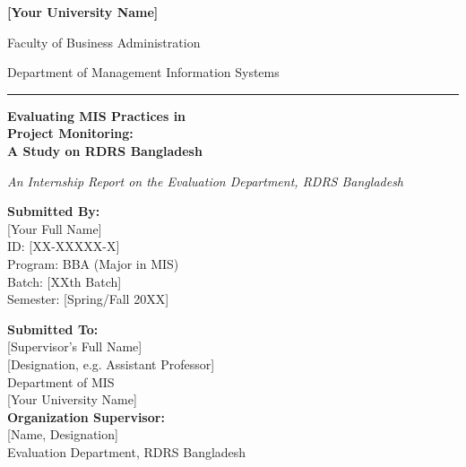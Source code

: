 \documentclass[12pt,a4paper]{report}
\begin{document}
\begin{titlepage}
    \centering

    {\Large\bfseries [Your University Name] \par}
    \vspace{4pt}
    {\large Faculty of Business Administration \par}
    {\normalsize Department of Management Information Systems \par}

    \vspace{12pt}
    \rule{\textwidth}{1.5pt}
    \vspace{12pt}

    {\LARGE\bfseries Evaluating MIS Practices in\\[6pt] Project Monitoring:\\[6pt]
        A Study on RDRS Bangladesh \par}
    \vspace{12pt}
    {\large\itshape An Internship Report on the Evaluation Department,
        RDRS Bangladesh \par}

    \vspace{16pt}

    \begin{minipage}[t]{0.46\textwidth}
        \raggedright
        \textbf{Submitted By:}\\[4pt]
        [Your Full Name]\\           %
        ID: [XX-XXXXX-X]\\           %
        Program: BBA (Major in MIS)\\%
        Batch: [XXth Batch]\\        %
        Semester: [Spring/Fall 20XX] %
    \end{minipage}
    \hfill
    \begin{minipage}[t]{0.46\textwidth}
        \raggedright
        \textbf{Submitted To:}\\[4pt]
        [Supervisor's Full Name]\\[4pt] %
        [Designation, e.g. Assistant Professor]\\[4pt] %
        Department of MIS\\[4pt]        %
        [Your University Name]\\
        \vspace{6pt}
        \textbf{Organization Supervisor:}\\[4pt] %
        [Name, Designation]\\
        Evaluation Department, RDRS Bangladesh
    \end{minipage}


\end{titlepage}
\end{document}
